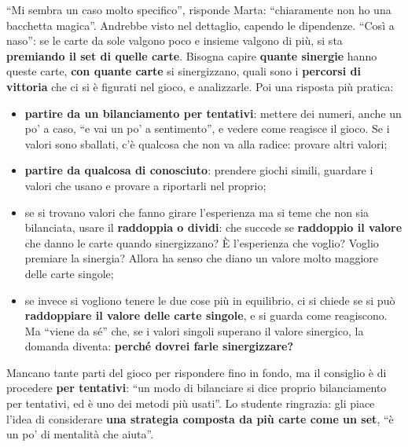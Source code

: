 ``Mi sembra un caso molto specifico'', risponde Marta: ``chiaramente non ho una bacchetta
magica''. Andrebbe visto nel dettaglio, capendo le dipendenze. ``Così a naso'': se le carte da
sole valgono poco e insieme valgono di più, si sta \textbf{premiando il set di quelle carte}.
Bisogna capire \textbf{quante sinergie} hanno queste carte, \textbf{con quante carte} si
sinergizzano, quali sono i \textbf{percorsi di vittoria} che ci si è figurati nel gioco, e
analizzarle. Poi una risposta più pratica:
\begin{itemize}
  \item \textbf{partire da un bilanciamento per tentativi}: mettere dei numeri, anche un po' a
        caso, ``e vai un po' a sentimento'', e vedere come reagisce il gioco. Se i valori sono
        sballati, c'è qualcosa che non va alla radice: provare altri valori;
  \item \textbf{partire da qualcosa di conosciuto}: prendere giochi simili, guardare i valori
        che usano e provare a riportarli nel proprio;
  \item se si trovano valori che fanno girare l'esperienza ma si teme che non sia bilanciata,
        usare il \textbf{raddoppia o dividi}: che succede se \textbf{raddoppio il valore} che
        danno le carte quando sinergizzano? È l'esperienza che voglio? Voglio premiare la
        sinergia? Allora ha senso che diano un valore molto maggiore delle carte singole;
  \item se invece si vogliono tenere le due cose più in equilibrio, ci si chiede se si può
        \textbf{raddoppiare il valore delle carte singole}, e si guarda come reagiscono. Ma
        ``viene da sé'' che, se i valori singoli superano il valore sinergico, la domanda
        diventa: \textbf{perché dovrei farle sinergizzare?}
\end{itemize}
Mancano tante parti del gioco per rispondere fino in fondo, ma il consiglio è di procedere
\textbf{per tentativi}: ``un modo di bilanciare si dice proprio bilanciamento per tentativi, ed
è uno dei metodi più usati''. Lo studente ringrazia: gli piace l'idea di considerare
\textbf{una strategia composta da più carte come un set}, ``è un po' di mentalità che aiuta''.

